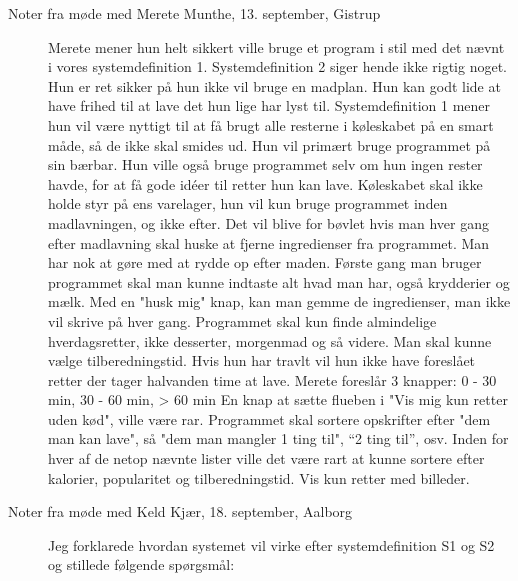 \begin{description}
\item[Noter fra møde med Merete Munthe, 13. september, Gistrup]
Merete mener hun helt sikkert ville bruge et program i stil med det nævnt i vores systemdefinition 1. Systemdefinition 2 siger hende ikke rigtig noget. Hun er ret sikker på hun ikke vil bruge en madplan. Hun kan godt lide at have frihed til at lave det hun lige har lyst til. Systemdefinition 1 mener hun vil være nyttigt til at få brugt alle resterne i køleskabet på en smart måde, så de ikke skal smides ud. Hun vil primært bruge programmet på sin bærbar.
Hun ville også bruge programmet selv om hun ingen rester havde, for at få gode idéer til retter hun kan lave.
Køleskabet skal ikke holde styr på ens varelager, hun vil kun bruge programmet inden madlavningen, og ikke efter. Det vil blive for bøvlet hvis man hver gang efter madlavning skal huske at fjerne ingredienser fra programmet. Man har nok at gøre med at rydde op efter maden.
Første gang man bruger programmet skal man kunne indtaste alt hvad man har, også krydderier og mælk. Med en "husk mig" knap, kan man gemme de ingredienser, man ikke vil skrive på hver gang.
Programmet skal kun finde almindelige hverdagsretter, ikke desserter, morgenmad og så videre.
Man skal kunne vælge tilberedningstid. Hvis hun har travlt vil hun ikke have foreslået retter der tager halvanden time at lave. Merete foreslår 3 knapper: 0 - 30 min, 30 - 60 min, > 60 min
En knap at sætte flueben i "Vis mig kun retter uden kød", ville være rar.
Programmet skal sortere opskrifter efter "dem man kan lave", så "dem man mangler 1 ting til", “2 ting til”, osv.
Inden for hver af de netop nævnte lister ville det være rart at kunne sortere efter kalorier, popularitet og tilberedningstid.
Vis kun retter med billeder.

\item[Noter fra møde med Keld Kjær, 18. september, Aalborg]
Jeg forklarede hvordan systemet vil virke efter systemdefinition S1 og S2 og stillede følgende spørgsmål:


\end{description}
